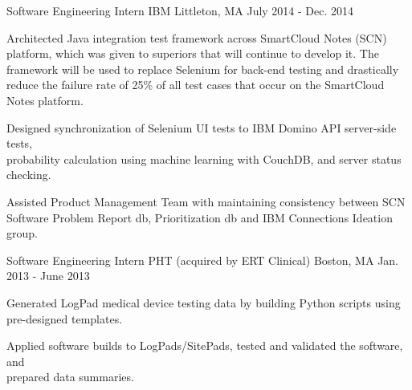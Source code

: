 \begin{cventries}
\vspace{5mm}
  \cventry
    {Software Engineering Intern} %
    {IBM} %
    {Littleton, MA} %
    {July 2014 - Dec. 2014} %
    {
      \begin{cvitems} %
        \item {Architected Java integration test framework across SmartCloud Notes (SCN) platform, which was given to superiors that will continue to develop it. The framework will be used to replace Selenium for back-end testing and drastically reduce the failure rate of 25\% of all test cases that occur on the SmartCloud Notes platform.}
        \item {Designed synchronization of Selenium UI tests to IBM Domino API server-side tests, \\probability calculation using machine learning with CouchDB, and server status checking.}
        \item {Assisted Product Management Team with maintaining consistency between SCN Software Problem Report db, Prioritization db and IBM Connections Ideation group.}
      \end{cvitems}
    }

\vspace{5mm}
  \cventry
    {Software Engineering Intern} %
    {PHT (acquired by ERT Clinical)} %
    {Boston, MA} %
    {Jan. 2013 - June 2013} %
    {
      \begin{cvitems} %
        \item {Generated LogPad medical device testing data by building Python scripts using pre-designed templates.}
        \item {Applied software builds to LogPads/SitePads, tested and validated the software, and \\prepared data summaries.}
      \end{cvitems}
    }

\end{cventries}